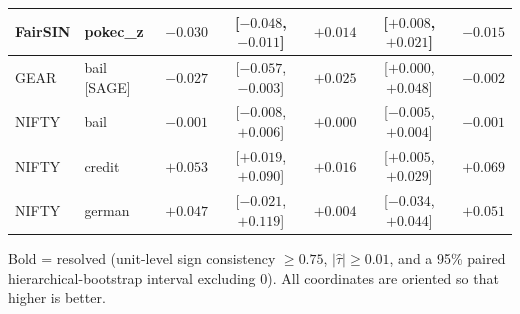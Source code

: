 \begin{table}[t]
\begin{tabular}{llrcrcr}
FairSIN & pokec\_z & $-0.030$ & [$-0.048$, $-0.011$] & $\mathbf{+0.014}$ & [$+0.008$, $+0.021$] & $-0.015$ \\
\midrule
GEAR & bail [SAGE] & $-0.027$ & [$-0.057$, $-0.003$] & $+0.025$ & [$+0.000$, $+0.048$] & $-0.002$ \\
\midrule
NIFTY & bail & $-0.001$ & [$-0.008$, $+0.006$] & $+0.000$ & [$-0.005$, $+0.004$] & $-0.001$ \\
NIFTY & credit & $+0.053$ & [$+0.019$, $+0.090$] & $\mathbf{+0.016}$ & [$+0.005$, $+0.029$] & $+0.069$ \\
NIFTY & german & $+0.047$ & [$-0.021$, $+0.119$] & $+0.004$ & [$-0.034$, $+0.044$] & $+0.051$ \\
\bottomrule
\end{tabular}
\par\smallskip\footnotesize Bold = resolved (unit-level sign consistency $\geq 0.75$, $|\hat\tau| \geq 0.01$, and a 95\% paired hierarchical-bootstrap interval excluding 0). All coordinates are oriented so that higher is better.
\end{table}
